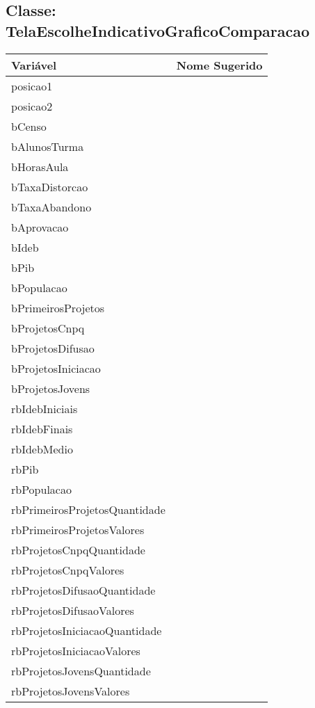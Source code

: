 \documentclass[12pt]{article}
\begin{document}
	\subsection{Classe: TelaEscolheIndicativoGraficoComparacao}
		\begin{table}[H]
			\begin{center}
				\begin{tabular}{l | l}
					\toprule
						Variável & Nome Sugerido\\
					\midrule
						posicao1 & \\
						posicao2 & \\
						bCenso & \\
						bAlunosTurma & \\
						bHorasAula & \\
						bTaxaDistorcao & \\
						bTaxaAbandono & \\
						bAprovacao & \\
						bIdeb & \\
						bPib & \\
						bPopulacao & \\
						bPrimeirosProjetos & \\
						bProjetosCnpq & \\
						bProjetosDifusao & \\
						bProjetosIniciacao & \\
						bProjetosJovens & \\
						rbIdebIniciais & \\
						rbIdebFinais & \\
						rbIdebMedio & \\
						rbPib & \\
						rbPopulacao & \\
						rbPrimeirosProjetosQuantidade & \\
						rbPrimeirosProjetosValores & \\
						rbProjetosCnpqQuantidade & \\
						rbProjetosCnpqValores & \\
						rbProjetosDifusaoQuantidade & \\
						rbProjetosDifusaoValores & \\
						rbProjetosIniciacaoQuantidade & \\
						rbProjetosIniciacaoValores & \\
						rbProjetosJovensQuantidade & \\
						rbProjetosJovensValores & \\

\end{tabular}
\end{center}
\end{table}
\end{document}

